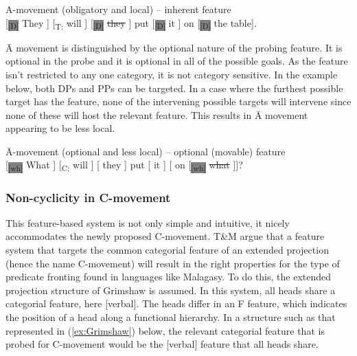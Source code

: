 \documentclass[output=paper,colorlinks,citecolor=brown,
]{langscibook}
\begin{document}
\ea A-movement (obligatory and local) -- inherent feature\\ 
{[}\textsubscript{\colorbox{Gray}{[D]}} They ]  [\textsubscript{T:} will ] [\textsubscript{\colorbox{Gray}{[D]}} \sout{they} ] put [\textsubscript{\colorbox{Gray}{[D]}} it ] on [\textsubscript{\colorbox{Gray}{[D]}} the table].
\z

\hspace{\parindent} \=A movement is distinguished by the optional nature of the probing feature.  It is optional in the probe and it is optional in all of the possible goals.  As the feature isn't restricted to any one category, it is not category sensitive.  In the example below, both DPs and PPs can be targeted.  In a case where the furthest possible target has the feature, none of the intervening possible targets will intervene since none of these will host the relevant feature.  This results in \=A movement appearing to be less local.  

\ea \=A-movement (optional and less local) -- optional (movable) feature\\
\vspace{.2cm}
[\textsubscript{\colorbox{Gray}{[wh]}} What ] [\textsubscript{C:} will ] {[} they  ] put [ it ] [ on [\textsubscript{\colorbox{Gray}{[wh]}} \sout{what} ]]? \label{ex:wh5}
\z

\subsubsection{Non-cyclicity in C-movement}

This feature-based system is not only simple and intuitive, it nicely accommodates the newly proposed C-movement.  T\&M argue that a feature system that targets the common categorial feature of an extended projection (hence the name C-movement) will result in the right properties for the type of predicate fronting found in languages like Malagasy.  To do this, the extended projection structure of Grimshaw \citeyearpar{Grimshaw:2000} is assumed.  In this system, all heads share a categorial feature, here [verbal].  The heads differ in an F feature, which indicates the position of a head along a functional hierarchy.  In a structure such as that represented in (\ref{ex:Grimshaw}) below, the relevant categorial feature that is probed for C-movement would be the  [verbal] feature that all heads share.
\end{document}

